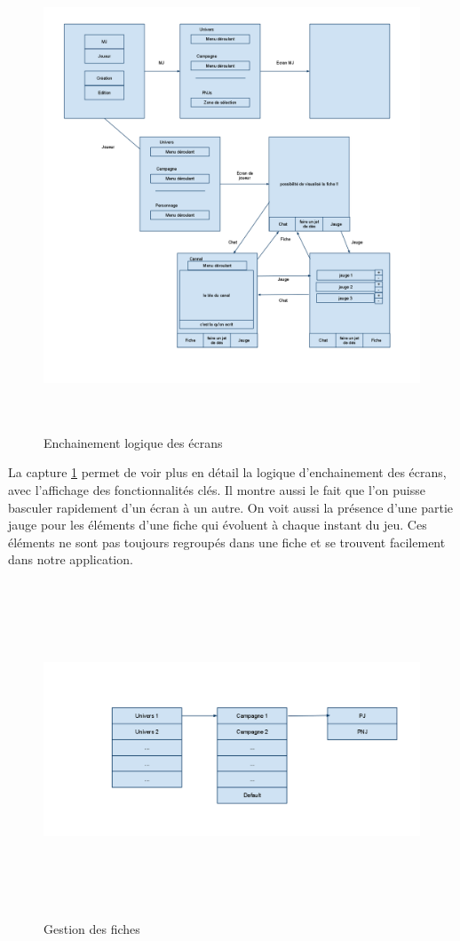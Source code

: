 \documentclass[11pt,a4paper]{article}
\begin{document}
\begin{figure}[h]
  	
\includegraphics[height=14cm,width=15cm]{image/screen2.png}
  		\caption{Enchainement logique des écrans}
  		\label{screen2}
\end{figure}

La capture \ref{screen2} permet de voir plus en détail la logique d'enchainement
des écrans, avec l'affichage des fonctionnalités clés. Il montre aussi le fait
que l'on puisse basculer rapidement d'un écran à un autre. On voit aussi la
présence d'une partie jauge pour les éléments d'une fiche qui évoluent à chaque
instant du jeu. Ces éléments ne sont pas toujours regroupés dans une fiche et
se trouvent facilement dans notre application.

\begin{figure}[h]
  	
\includegraphics[height=10cm,width=15cm]{image/screen3.png}
  		\caption{Gestion des fiches}
  		\label{screen3}
\end{figure}
\end{document}
